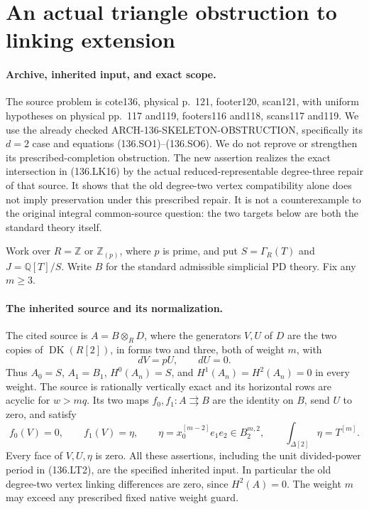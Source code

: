 \section{An actual triangle obstruction to linking extension}
\label{sec:136-linking-triangle-obstruction}

\paragraph{Archive, inherited input, and exact scope.}
The source problem is cote136, physical p.~121, footer120,
scan121, with uniform hypotheses on physical pp.~117 and119,
footers116 and118, scans117 and119.  We use the already checked
\textup{ARCH-136-SKELETON-OBSTRUCTION}, specifically its
\(d=2\) case and equations (136.SO1)--(136.SO6).
We do not reprove or strengthen its prescribed-completion
obstruction.  The new assertion realizes the exact intersection
in (136.LK16) by the actual reduced-representable degree-three
repair of that source.  It shows that the old degree-two
vertex compatibility alone does not imply preservation under
this prescribed repair.  It is not a counterexample to the
original integral common-source question: the two targets
below are both the standard theory itself.

Work over \(R=\mathbb Z\) or \(\mathbb Z_{(p)}\), where
\(p\) is prime, and put \(S=\Gamma_R(T)\) and
\(J=\mathbb Q[T]/S\).  Write \(B\) for the standard
admissible simplicial PD theory.  Fix any \(m\geq3\).

\paragraph{The inherited source and its normalization.}
The cited source is \(A=B\otimes_R D\), where the generators
\(V,U\) of \(D\) are the two copies of
\(\operatorname{DK}(R[2])\), in forms two and three,
both of weight \(m\), with
\[
                 dV=pU,\qquad dU=0.
                                                               \tag{136.LT1}
\]
Thus \(A_0=S\), \(A_1=B_1\), \(H^0(A_n)=S\),
and \(H^1(A_n)=H^2(A_n)=0\) in every weight.
The source is rationally vertically exact and its horizontal
rows are acyclic for \(w>mq\).  Its two maps
\(f_0,f_1:A\rightrightarrows B\) are the identity on
\(B\), send \(U\) to zero, and satisfy
\[
 f_0(V)=0,\qquad f_1(V)=\eta,
 \qquad \eta=x_0^{[m-2]}e_1e_2\in B_2^{m,2},
 \qquad \int_{\Delta[2]}\eta=T^{[m]}.
                                                               \tag{136.LT2}
\]
Every face of \(V,U,\eta\) is zero.  All these assertions,
including the unit divided-power period in (136.LT2), are the
specified inherited input.  In particular the old degree-two
vertex linking differences are zero, since \(H^2(A)=0\).
The weight \(m\) may exceed any prescribed fixed native
weight guard.


